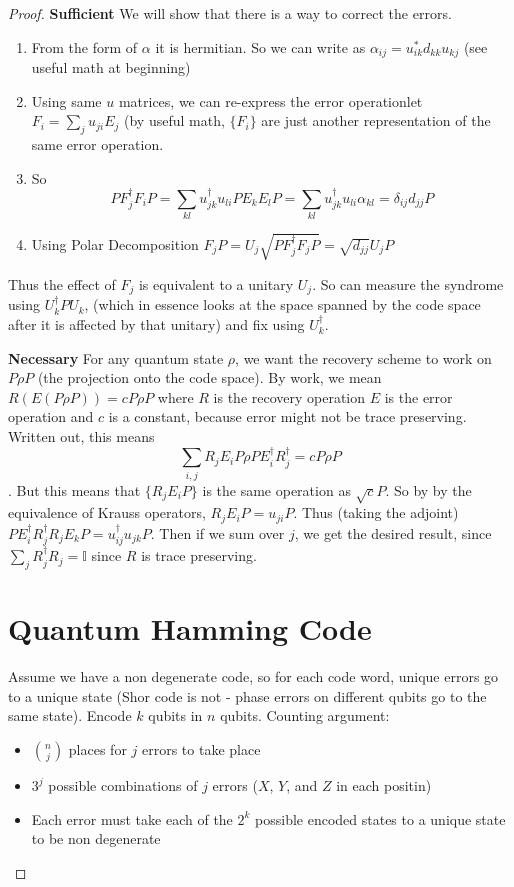 \documentclass[12pt]{article}
\begin{document}
\begin{proof}

{\bf{Sufficient}} We will show that there is a way to correct the errors. 
\begin{enumerate}
\item From the form of $\alpha$ it is hermitian. So we can write as $\alpha_{ij}=u_{ik}^*d_{kk}u_{kj}$ (see useful math at beginning)
\item Using same $u$ matrices, we can re-express the error operationlet $F_i=\sum_j u_{ji}E_j$ (by useful math, $\{F_i\}$ are just another representation of the same error operation.
\item So $$ PF_j^\dagger F_i P=\sum_{kl}u_{jk}^\dagger u_{li} PE_kE_lP=\sum_{kl}u_{jk}^\dagger u_{li}\alpha_{kl}=\delta_{ij} d_{jj} P$$
\item Using Polar Decomposition $F_jP=U_j\sqrt{PF_j^\dagger F_j P}=\sqrt{d_{jj}}U_jP$
\end{enumerate}
Thus the effect of $F_j$ is equivalent to a unitary $U_j$. So can measure the syndrome using $U_k^\dagger PU_k$,  (which in essence looks at the space spanned by the code space after it is affected by that unitary) and fix using $U_k^\dagger$.

{\bf{Necessary}}
For any quantum state $\rho$, we want the recovery scheme to work on $P\rho P$ (the projection onto the code space). By work, we mean $R(E(P\rho P))=cP\rho P$ where $R$ is the recovery operation $E$ is the error operation and $c$ is a constant, because error might not be trace preserving. Written out, this means
$$ \sum_{i,j}R_jE_iP\rho P E_i^\dagger R_j^\dagger=cP\rho P$$. 
But this means that $\{R_jE_iP\}$ is the same operation as $\sqrt{c}P$. So by by the equivalence of Krauss operators, $R_jE_iP=u_{ji}P$. Thus (taking the adjoint) $PE_i^\dagger R_j^\dagger R_jE_kP=u_{ij}^\dagger u_{jk} P$. Then if we sum over $j$, we get the desired result, since $\sum_j R_j^\dagger R_j=\mathbb{I}$ since $R$ is trace preserving.

\section{Quantum Hamming Code}

Assume we have a non degenerate code, so for each code word, unique errors go to a unique state (Shor code is not - phase errors on different qubits go to the same state). Encode $k$ qubits in $n$ qubits. Counting argument:
\begin{itemize}
\item $\binom{n}{j}$ places for $j$ errors to take place
\item $3^j$ possible combinations of $j$ errors ($X$, $Y$, and $Z$ in each positin)
\item Each error must take each of the $2^k$ possible encoded states to a unique state to be non degenerate
\end{itemize}


\end{proof}
\end{document}
